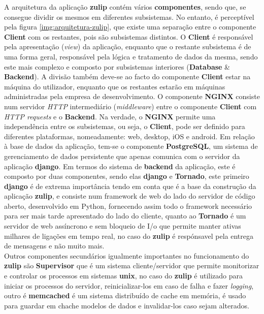 \documentclass[11pt,a4paper]{report}%
\begin{document}
A arquitetura da aplicação \textbf{zulip} contém vários \textbf{componentes}, sendo que, se consegue dividir os mesmos em diferentes subsistemas. No entanto, é perceptível pela figura \ref{img:arquitetura-zulip}, que existe uma separação entre o componente \textbf{Client} com os restantes, pois são subsistemas distintos.
\newline
O \textbf{Client} é responsável pela apresentação (\emph{view}) da aplicação, enquanto que o restante subsistema é de uma forma geral, responsável pela lógica e tratamento de dados da mesma, sendo este mais complexo e composto por subsistemas interiores (\textbf{Database} \& \textbf{Backend}).
\newline
A divisão também deve-se ao facto do componente \textbf{Client} estar na máquina do utilizador, enquanto que os restantes estarão em máquinas administradas pela empresa de desenvolvimento.
\newline
O componente \textbf{NGINX} consiste num servidor \emph{HTTP} intermediário (\emph{middleware}) entre o componente \textbf{Client} com \emph{HTTP requests} e o \textbf{Backend}. Na verdade, o \textbf{NGINX} permite uma independência entre os subsistemas, ou seja, o \textbf{Client}, pode ser definido para diferentes plataformas, nomeadamente: web, desktop, iOS e android.
\newline
Em relação à base de dados da aplicação, tem-se o componente \textbf{PostgreSQL}, um sistema de gerenciamento de dados persistente que apenas comunica com o servidor da aplicação \textbf{django}.
\newline
Em termos do sistema de \textbf{backend} da aplicação, este é composto por duas componentes, sendo elas \textbf{django} e \textbf{Tornado}, este primeiro \textbf{django} é de extrema importância tendo em conta que é a base da construção da aplicação \textbf{zulip}, e consiste num framework de web do lado do servidor de código aberto, desenvolvido em Python, fornecendo assim todo o framework necessário para ser mais tarde apresentado do lado do cliente, quanto ao \textbf{Tornado} é um servidor de web assíncrono e sem bloqueio de I/o que permite manter ativas milhares de ligações em tempo real, no caso do \textbf{zulip} é respónsavel pela entrega de mensagens e não muito mais.\\ Outros componentes secundários igualmente importantes no funcionamento do \textbf{zulip} são \textbf{Supervisor} que é um sistema cliente/servidor que permite monitorizar e controlar os processos em sistemas \textbf{unix}, no caso do \textbf{zulip} é utilizado para iniciar os processos do servidor, reinicializar-los em caso de falha e fazer \emph{logging}, outro é \textbf{memcached} é um sistema distribuído de cache em memória, é usado para guardar em chache modelos de dados e invalidar-los caso sejam alterados.\\
\end{document}
